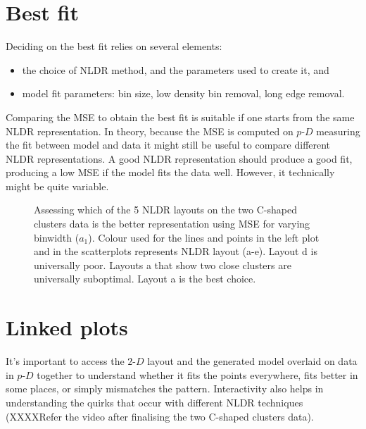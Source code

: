 \documentclass[
  12pt]{article}
\providecommand{\tightlist}{%
  \setlength{\itemsep}{0pt}\setlength{\parskip}{0pt}}\usepackage{longtable,booktabs,array}
\def\tightlist{}
\newcommand\pD{$p\text{-}D$}
\newcommand\gD{$2\text{-}D$}
\begin{document}
\section{Best fit}\label{best-fit}

Deciding on the best fit relies on several elements:

\begin{itemize}
\tightlist
\item
  the choice of NLDR method, and the parameters used to create it, and
\item
  model fit parameters: bin size, low density bin removal, long edge
  removal.
\end{itemize}

Comparing the MSE to obtain the best fit is suitable if one starts from
the same NLDR representation. In theory, because the MSE is computed on
\pD{} measuring the fit between model and data it might still be useful
to compare different NLDR representations. A good NLDR representation
should produce a good fit, producing a low MSE if the model fits the
data well. However, it technically might be quite variable.

\begin{figure}[H]


\caption{\label{fig-two_non_linear_diff_shaped_close_clusters-mse}Assessing
which of the 5 NLDR layouts on the two C-shaped clusters data is the
better representation using MSE for varying binwidth (\(a_1\)). Colour
used for the lines and points in the left plot and in the scatterplots
represents NLDR layout (a-e). Layout d is universally poor. Layouts a
that show two close clusters are universally suboptimal. Layout a is the
best choice.}

\end{figure}%

\section{Linked plots}\label{linked-plots}

It's important to access the \gD{} layout and the generated model
overlaid on data in \pD{} together to understand whether it fits the
points everywhere, fits better in some places, or simply mismatches the
pattern. Interactivity also helps in understanding the quirks that occur
with different NLDR techniques (XXXXRefer the video after finalising the
two C-shaped clusters data).
\end{document}
